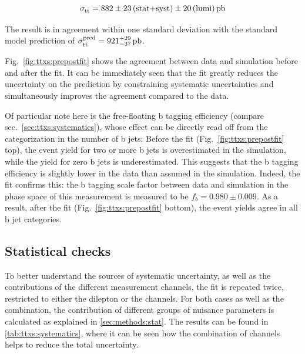 \[
    \sigma_{\mathrm{t \bar{t}}} = 882 \pm 23 \, \text{(stat+syst)} \pm 20 \, \text{(lumi)} \, \text{pb}
\]

The result is in agreement within one standard deviation with the standard model prediction of $\sigma_{\mathrm{t \bar{t}}}^{\text{pred}} = 921^{+29}_{-37} \, \text{pb}$.

Fig.~\ref{fig:ttxs:prepostfit} shows the agreement between data and simulation before and after the fit. It can be immediately seen that the fit greatly reduces the uncertainty on the prediction by constraining systematic uncertainties and simultaneously improves the agreement compared to the data. 

Of particular note here is the free-floating b tagging efficiency (compare sec.~\ref{sec:ttxs:systematics}), whose effect can be directly read off from the categorization in the number of b jets: Before the fit (Fig.~\ref{fig:ttxs:prepostfit} top), the event yield for two or more b jets is overestimated in the simulation, while the yield for zero b jets is underestimated. This suggests that the b tagging efficiency is slightly lower in the data than assumed in the simulation. Indeed, the fit confirms this: the b tagging scale factor between data and simulation in the phase space of this measurement is measured to be $f_b  = 0.980 \pm 0.009$. As a result, after the fit (Fig.~\ref{fig:ttxs:prepostfit} bottom), the event yields agree in all b jet categories.

\subsection{Statistical checks}

To better understand the sources of systematic uncertainty, as well as the contributions of the different measurement channels, the fit is repeated twice, restricted to either the dilepton or the \ljets channels. For both cases as well as the combination, the contribution of different groups of nuisance parameters is calculated as explained in \cref{sec:methods:stat}. The results can be found in \cref{tab:ttxs:systematics}, where it can be seen how the combination of channels helps to reduce the total uncertainty. 

